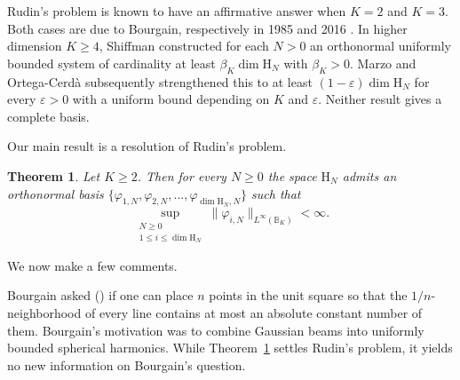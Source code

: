 \documentclass[a4paper,reqno,12pt]{amsart}
\theoremstyle{plain}
\newtheorem{theorem}{Theorem}
\theoremstyle{plain}
\theoremstyle{remark}
\theoremstyle{plain}
\newcommand{\PolySpace}{\mathrm{H}}
\newcommand{\p}{\varphi}
\newcommand{\Sphere}{\mathbb{S}}
\theoremstyle{plain}
\theoremstyle{plain}
\begin{document}
{%

Rudin's problem is known to have an affirmative answer when $K = 2$ and
$K = 3$. Both cases are due to Bourgain, respectively in 1985 \cite{Bour1} and
2016 \cite{Bour2}. In higher dimension $K \geq 4$, Shiffman \cite{S} constructed for 
each $N > 0$ an orthonormal uniformly bounded system of cardinality
at least $\beta_K \dim \PolySpace_N$ with $\beta_K > 0$. Marzo and Ortega-Cerd\`a \cite{MO}
subsequently strengthened this to at least
$(1-\varepsilon)\dim\PolySpace_N$ for every $\varepsilon>0$ with a 
uniform bound depending on $K$ and $\varepsilon$. Neither result gives a complete basis.  
 
Our main result is a resolution of Rudin's problem.  

\begin{theorem}\label{thm:onb}
Let $K\geq 2$. Then for every $N\geq 0$
the space $\PolySpace_N$ admits an orthonormal basis
$\{\p_{1, N},\p_{2, N},\ldots,\p_{\dim\PolySpace_N, N}\}$ such that
\[
  \sup_{\substack{N \geq 0 \\ 1\leq i\leq \dim\PolySpace_N}}\|\p_{i, N}\|_{L^\infty(\mathbb B_K)}<\infty.
\]
\end{theorem}
We now make a few comments.

Bourgain asked (\cite[p.~957]{RememberingBourgain}) if one can
place $n$ points in the unit square so that the $1/n$-neighborhood of every
line contains at most an absolute constant number of them.  Bourgain's
motivation was to combine Gaussian beams into uniformly bounded spherical
harmonics. While Theorem~\ref{thm:onb} settles Rudin's problem, it yields
no new information on Bourgain's question.
 
}
\end{document}
